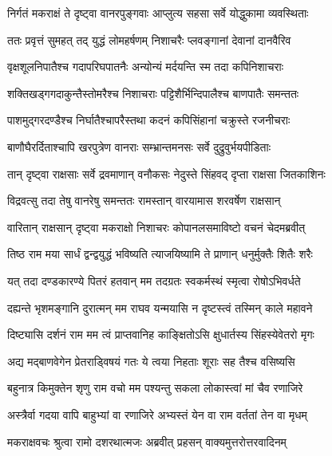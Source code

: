 
\twolineshloka
{निर्गतं मकराक्षं ते दृष्ट्वा वानरपुङ्गवाः}
{आप्लुत्य सहसा सर्वे योद्धुकामा व्यवस्थिताः} %

\twolineshloka
{ततः प्रवृत्तं सुमहत् तद् युद्धं लोमहर्षणम्}
{निशाचरैः प्लवङ्गानां देवानां दानवैरिव} %

\twolineshloka
{वृक्षशूलनिपातैश्च गदापरिघपातनैः}
{अन्योन्यं मर्दयन्ति स्म तदा कपिनिशाचराः} %

\twolineshloka
{शक्तिखड्गगदाकुन्तैस्तोमरैश्च निशाचराः}
{पट्टिशैर्भिन्दिपालैश्च बाणपातैः समन्ततः} %

\twolineshloka
{पाशमुद्गरदण्डैश्च निर्घातैश्चापरैस्तथा}
{कदनं कपिसिंहानां चक्रुस्ते रजनीचराः} %

\twolineshloka
{बाणौघैरर्दिताश्चापि खरपुत्रेण वानराः}
{सम्भ्रान्तमनसः सर्वे दुद्रुवुर्भयपीडिताः} %

\twolineshloka
{तान् दृष्ट्वा राक्षसाः सर्वे द्रवमाणान् वनौकसः}
{नेदुस्ते सिंहवद् दृप्ता राक्षसा जितकाशिनः} %

\twolineshloka
{विद्रवत्सु तदा तेषु वानरेषु समन्ततः}
{रामस्तान् वारयामास शरवर्षेण राक्षसान्} %

\twolineshloka
{वारितान् राक्षसान् दृष्ट्वा मकराक्षो निशाचरः}
{कोपानलसमाविष्टो वचनं चेदमब्रवीत्} %

\twolineshloka
{तिष्ठ राम मया सार्धं द्वन्द्वयुद्धं भविष्यति}
{त्याजयिष्यामि ते प्राणान् धनुर्मुक्तैः शितैः शरैः} %

\twolineshloka
{यत् तदा दण्डकारण्ये पितरं हतवान् मम}
{तदग्रतः स्वकर्मस्थं स्मृत्वा रोषोऽभिवर्धते} %

\twolineshloka
{दह्यन्ते भृशमङ्गानि दुरात्मन् मम राघव}
{यन्मयासि न दृष्टस्त्वं तस्मिन् काले महावने} %

\twolineshloka
{दिष्ट्यासि दर्शनं राम मम त्वं प्राप्तवानिह}
{काङ्क्षितोऽसि क्षुधार्तस्य सिंहस्येवेतरो मृगः} %

\twolineshloka
{अद्य मद्बाणवेगेन प्रेतराड्विषयं गतः}
{ये त्वया निहताः शूराः सह तैश्च वसिष्यसि} %

\twolineshloka
{बहुनात्र किमुक्तेन शृणु राम वचो मम}
{पश्यन्तु सकला लोकास्त्वां मां चैव रणाजिरे} %

\twolineshloka
{अस्त्रैर्वा गदया वापि बाहुभ्यां वा रणाजिरे}
{अभ्यस्तं येन वा राम वर्ततां तेन वा मृधम्} %

\twolineshloka
{मकराक्षवचः श्रुत्वा रामो दशरथात्मजः}
{अब्रवीत् प्रहसन् वाक्यमुत्तरोत्तरवादिनम्} %

